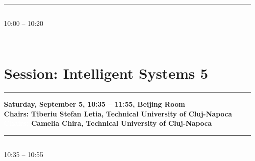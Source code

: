             
            \\ 
            \noindent\rule{\textwidth}{0.4pt}
\vspace*{-36pt}\subsection[ 
    	   {\bf Semi-automated Verdicts Assignment for Potentially Malicious Programs
           } \\
           {\it Ciprian Oprisa, George Beniamin Cabau, Gheorghe Sebestyen
           }
	]
	    {
            }
	   10:00 -- 10:20 \nopagebreak
	   
            
            \\ 


\section{{\bf \large Session:  %
Intelligent Systems 5
}} \vspace{-15pt}%
\noindent\rule{\textwidth}{0.4pt} \nopagebreak
{\bf  
Saturday, September 5, 10:35 -- 11:55, Beijing Room
} \\ \nopagebreak
{\bf  Chairs: 
Tiberiu Stefan Letia, Technical University of Cluj-Napoca
} \\ \nopagebreak
{\bf  \textcolor{white}{Chairs:} 
Camelia Chira, Technical University of Cluj-Napoca
} \\ \nopagebreak
\noindent\rule{\textwidth}{0.4pt} \nopagebreak

\vspace*{-36pt}\subsection[ 
    	   {\bf Evolutionary Synthesis of Hybrid Controllers
           } \\
           {\it Tiberiu Stefan Letia, Attila Ors Kilyen
           }
	]
	    {
            }
	   10:35 -- 10:55 \nopagebreak
	   
